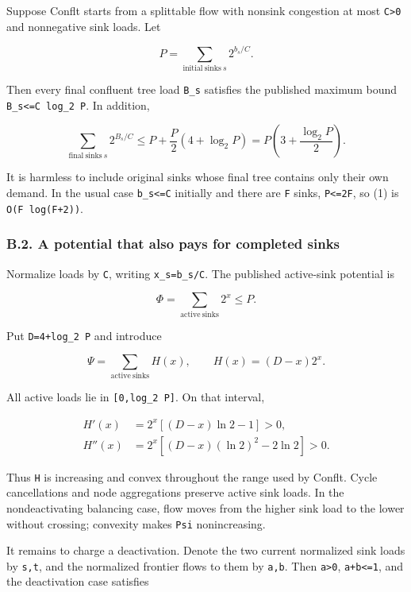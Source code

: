 Suppose Conflt starts from a splittable flow with nonsink congestion at most \texttt{C\textgreater{}0} and nonnegative sink loads. Let

\[
P=\sum_{\mathrm{initial\ sinks}\ s}2^{b_s/C}.
\]

Then every final confluent tree load \texttt{B\_s} satisfies the published maximum bound \texttt{B\_s\textless{}=C\ log\_2\ P}. In addition,

\[
\sum_{\mathrm{final\ sinks}\ s}2^{B_s/C}\le P+\frac P2(4+\log_2P)=P\left(3+\frac{\log_2P}{2}\right).\tag{1}
\]

It is harmless to include original sinks whose final tree contains only their own demand. In the usual case \texttt{b\_s\textless{}=C} initially and there are \texttt{F} sinks, \texttt{P\textless{}=2F}, so (1) is \texttt{O(F\ log(F+2))}.

\hypertarget{af-385fd70686-b.2.-a-potential-that-also-pays-for-completed-sinks}{%
\subsubsection{B.2. A potential that also pays for completed sinks}\label{af-385fd70686-b.2.-a-potential-that-also-pays-for-completed-sinks}}

Normalize loads by \texttt{C}, writing \texttt{x\_s=b\_s/C}. The published active-sink potential is

\[
\Phi=\sum_{\mathrm{active\ sinks}}2^x\le P.
\]

Put \texttt{D=4+log\_2\ P} and introduce

\[
\Psi=\sum_{\mathrm{active\ sinks}}H(x),\qquad H(x)=(D-x)2^x.
\]

All active loads lie in \texttt{{[}0,log\_2\ P{]}}. On that interval,

\[
\begin{aligned}H'(x)&=2^x[(D-x)\ln2-1]>0,\\H''(x)&=2^x[(D-x)(\ln2)^2-2\ln2]>0.\end{aligned}
\]

Thus \texttt{H} is increasing and convex throughout the range used by Conflt. Cycle cancellations and node aggregations preserve active sink loads. In the nondeactivating balancing case, flow moves from the higher sink load to the lower without crossing; convexity makes \texttt{Psi} nonincreasing.

It remains to charge a deactivation. Denote the two current normalized sink loads by \texttt{s,t}, and the normalized frontier flows to them by \texttt{a,b}. Then \texttt{a\textgreater{}0}, \texttt{a+b\textless{}=1}, and the deactivation case satisfies


